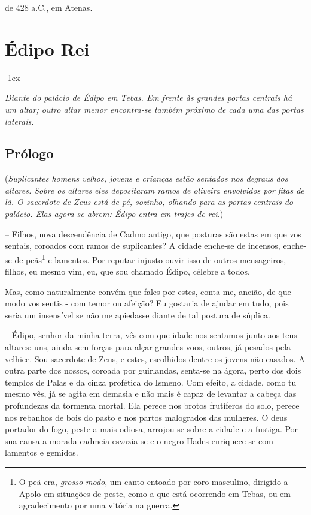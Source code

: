  de 428 a.C., em Atenas.


\clearpage

\chapter{Édipo Rei}

\begingroup
\parindent-1ex

\parskip4pt

 \emph{Diante do palácio de Édipo em Tebas. Em frente às grandes
portas centrais há um altar; outro altar menor encontra-se também
próximo de cada uma das portas laterais.}
\bigskip


\section{Prólogo}

(\emph{Suplicantes  homens velhos, jovens e crianças  estão sentados
nos degraus dos altares. Sobre os altares eles depositaram ramos de
oliveira envolvidos por fitas de lã. O sacerdote de Zeus está de pé,
sozinho, olhando para as portas centrais do palácio. Elas agora se
abrem: Édipo entra em trajes de rei.})
\bigskip

 --   Filhos, nova descendência de Cadmo antigo, que posturas são estas em que
vos sentais, coroados com ramos de suplicantes? A cidade enche-se de
incensos, enche-se de peãs\footnote{O peã era, \emph{grosso modo}, um 
canto entoado por coro masculino, dirigido a Apolo em situações de 
peste, como a que está ocorrendo em Tebas, ou em agradecimento por uma 
vitória na guerra.} e lamentos. Por reputar injusto ouvir isso de 
outros mensageiros, filhos, eu mesmo vim, eu, que sou chamado Édipo, 
célebre a todos.

Mas, como naturalmente convém que fales por estes, conta-me, ancião, de
que  modo vos sentis - com temor ou afeição? Eu gostaria de ajudar
em tudo, pois seria um insensível se não me apiedasse diante de tal
postura de súplica.

 --   Édipo, senhor da minha terra, vês com que idade nos sentamos junto aos
teus altares: uns, ainda sem forças para alçar grandes voos, outros, já
pesados pela velhice. Sou sacerdote de Zeus, e estes, escolhidos dentre
os jovens não casados. A outra parte  dos nossos, coroada por
guirlandas, senta-se na ágora, perto dos dois templos de Palas e da
cinza profética do Ismeno. Com efeito, a cidade, como tu mesmo vês, já
se agita em demasia e não mais é capaz de levantar a cabeça das
profundezas da tormenta mortal. Ela perece nos brotos frutíferos do
solo, perece nos rebanhos de bois do pasto e nos partos malogrados das
mulheres. O deus portador do fogo, peste a mais odiosa, arrojou-se sobre
a cidade e a fustiga. Por sua causa a morada cadmeia esvazia-se e o
negro Hades enriquece-se com lamentos e gemidos.

